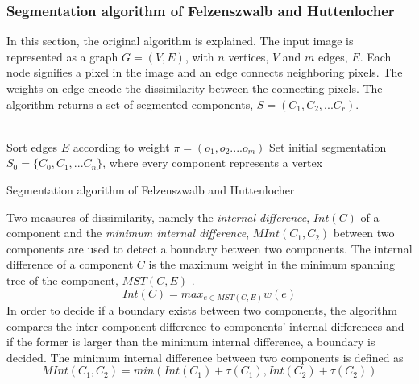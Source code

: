 \documentclass[12pt,twoside]{article}
\theoremstyle{plain}
\theoremstyle{definition}
\theoremstyle{remark}
\begin{document}
\subsubsection{Segmentation algorithm of Felzenszwalb and Huttenlocher}
\label{sec:felz}
In this section, the original algorithm \cite{felzenszwalb2004efficient} is explained. The input image is represented as a graph $G = (V,E)$, with $n$ vertices, $V$ and $m$ edges, $E$. Each node signifies a pixel in the image and an edge connects neighboring pixels. The weights on edge encode the dissimilarity between the connecting pixels. The algorithm returns a set of segmented components, $S = (C_1,C_2,...C_r)$.\\
\\
\begin{algorithm}[H]
\label{alg:felz}
\SetAlgoLined
{}
Sort edges $E$ according to weight $\pi = (o_1, o_2....o_m)$\;
Set initial segmentation $S_0 = \{C_0,C_1,...C_n\}$, where every component represents a vertex\;
\caption{Segmentation algorithm of Felzenszwalb and Huttenlocher \cite{felzenszwalb2004efficient}}
\end{algorithm}
\vspace{5mm}
Two measures of dissimilarity, namely the \textit{internal difference}, $Int(C)$ of a component and the \textit{minimum internal difference}, $MInt(C_1,C_2)$ between two components are used to detect a boundary between two components. The internal difference of a component $C$ is the maximum weight in the minimum spanning tree of the component, $MST(C, E)$ \cite{felzenszwalb2004efficient}.
\begin{equation}
\label{eq:int_diff}
Int(C) = max_{e \in MST(C,E)} w(e)
\end{equation}
In order to decide if a boundary exists between two components, the algorithm compares the inter-component difference to components' internal differences and if the former is larger than the minimum internal difference, a boundary is decided. The minimum internal difference between two components is defined as\\
\begin{equation}
\label{eq:mint}
MInt(C_1,C_2) = min(Int(C_1)+\tau(C_1), Int(C_2)+\tau(C_2))
\end{equation}
\end{document}
